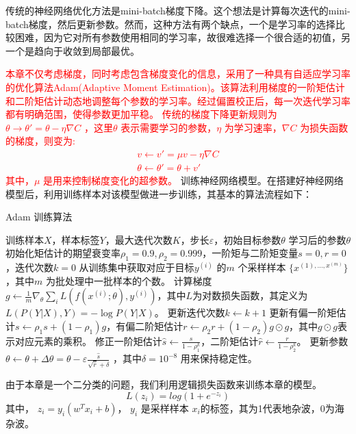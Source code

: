 传统的神经网络优化方法是mini-batch梯度下降。这个想法是计算每次迭代的mini-batch梯度，然后更新参数。然而，这种方法有两个缺点，一个是学习率的选择比较困难，因为它对所有参数使用相同的学习率，故很难选择一个很合适的初值，另一个是趋向于收敛到局部最优。

\textcolor{red}{
本章不仅考虑梯度，同时考虑包含梯度变化的信息，采用了一种具有自适应学习率的优化算法Adam(Adaptive Moment Estimation)。该算法利用梯度的一阶矩估计和二阶矩估计动态地调整每个参数的学习率。经过偏置校正后，每一次迭代学习率都有明确范围，使得参数更加平稳。
传统的梯度下降更新规则为$\theta \rightarrow \theta'=\theta-\eta\nabla C$ ，这里$\theta$ 表示需要学习的参数，$\eta$ 为学习速率，$\nabla C$ 为损失函数的梯度，则变为:
\begin{align}
	v\leftarrow v'=\mu v - \eta \nabla C \\
	\theta \leftarrow \theta' = \theta +v'
\end{align}
其中，$\mu$ 是用来控制梯度变化的超参数。
}
训练神经网络模型。在搭建好神经网络模型后，利用训练样本对该模型做进一步训练，其基本的算法流程如下：

\begin{algorithm}[hbt]
	\caption{Adam 训练算法}
	\begin{algorithmic}[1] %
		\Require 训练样本$X$，样本标签$Y$，最大迭代次数$K$，步长$\varepsilon$，初始目标参数$\theta$
		\Ensure 学习后的参数$\theta$
		\State 初始化矩估计的期望衰变率$\rho_1=0.9,\rho_2=0.999$，一阶矩与二阶矩变量$s=0,r=0$，迭代次数$k=0$
			\State 从训练集中获取对应于目标$y^{(i)}$ 的$m$ 个采样样本 $\{x^{(1),\dots,x^{(m)}}\}$ ，其中$m$ 为批处理中一批样本的个数。
			\label{line:start}
			\State 计算梯度$g \leftarrow \frac{1}{m} \nabla_{\theta} \sum_i L(f(x^{(i)};\theta), y^{(i)}) $，其中$L$为对数损失函数，其定义为$L(P(Y|X),Y) = - \log P(Y|X) $。
			\State 更新迭代次数$k \leftarrow k+1 $
			\State 更新有偏一阶矩估计$s \leftarrow \rho_1 s + (1 - \rho_1) g $，有偏二阶矩估计$r \leftarrow \rho_2 r + (1-\rho_2) g \odot g $，其中$ g \odot g $表示对应元素的乘积。
			\State 修正一阶矩估计$\hat{s} \leftarrow \frac{s}{1-\rho^k_1} $，二阶矩估计$\hat{r} \leftarrow \frac{r}{1-\rho^k_2} $。
			\State 更新参数 $\theta \leftarrow \theta + \Delta \theta = \theta - \varepsilon \frac{\hat{s}}{\sqrt{\hat{r}} + \delta} $
			，其中$\delta = 10^{-8} $
			用来保持稳定性。
		\EndWhile
	\end{algorithmic}
\end{algorithm}

由于本章是一个二分类的问题，我们利用逻辑损失函数来训练本章的模型。
\begin{equation}
	L(z_i) = log(1+e^{-z_i})
\end{equation}
其中， $z_i=y_i(w^T x_i + b)$， $y_i$ 是采样样本 $x_i$的标签，其为1代表地杂波，0为海杂波。

